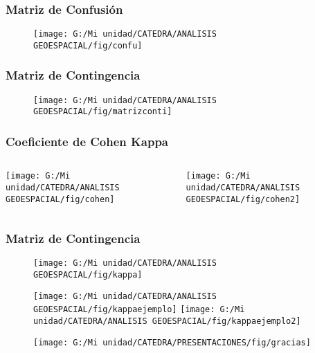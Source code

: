 \documentclass[14pt]{beamer}
\begin{document}
\begin{frame}
\frametitle{Matriz de Confusión}
  \begin{figure}
    \centering
    \texttt{[image: G:/Mi unidad/CATEDRA/ANALISIS GEOESPACIAL/fig/confu]}
  \end{figure}
\tiny{}
\end{frame}
\begin{frame}
\frametitle{Matriz de Contingencia}
  \begin{figure}
    \centering
    \texttt{[image: G:/Mi unidad/CATEDRA/ANALISIS GEOESPACIAL/fig/matrizconti]}
  \end{figure}
\tiny{}
\end{frame}
\begin{frame}
\frametitle{Coeficiente de Cohen Kappa}

\begin{columns}
		\begin{column}{.49\linewidth}
		 \texttt{[image: G:/Mi unidad/CATEDRA/ANALISIS GEOESPACIAL/fig/cohen]}
		\end{column}
		\begin{column}{.49\linewidth}
			 \texttt{[image: G:/Mi unidad/CATEDRA/ANALISIS GEOESPACIAL/fig/cohen2]}
		\end{column}
	\end{columns}
\end{frame}
\begin{frame}
\frametitle{Matriz de Contingencia}
  \begin{figure}
    \centering
    \texttt{[image: G:/Mi unidad/CATEDRA/ANALISIS GEOESPACIAL/fig/kappa]}
  \end{figure}
\tiny{}
\end{frame}
\begin{frame}
  \begin{figure}
    \centering
    \texttt{[image: G:/Mi unidad/CATEDRA/ANALISIS GEOESPACIAL/fig/kappaejemplo]}
  \texttt{[image: G:/Mi unidad/CATEDRA/ANALISIS GEOESPACIAL/fig/kappaejemplo2]}
  \end{figure}
\tiny{}
\end{frame}
\begin{frame}
  \begin{figure}
    \centering
    \texttt{[image: G:/Mi unidad/CATEDRA/PRESENTACIONES/fig/gracias]}
  \end{figure}
\tiny{}
\end{frame}
 
\end{document}
